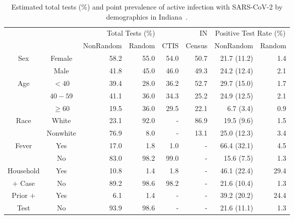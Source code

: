 \documentclass[11pt]{amsart}
\numberwithin{equation}{section}
\theoremstyle{plain}
\begin{document}
 \begin{table}[!th]
 \begin{tabular}{c | c | r r r | r | r r }
 & & \multicolumn{3}{c}{Total Tests (\%)} & IN & \multicolumn{2}{c}{Positive Test Rate (\%)}\\
 \cline{3-5} \cline{7-8}
 & & NonRandom & Random & CTIS & Census & NonRandom & Random \\ \hline
 \multirow{2}{*}{Sex} & Female & 58.2 & 55.0 & 54.0 & 50.7 & 21.7 (11.2) & 1.4 \\
 & Male & 41.8 & 45.0  & 46.0 & 49.3 & 24.2 (12.4) & 2.1 \\ \hline
 \multirow{3}{*}{Age} & $<40$ & 39.4 & 28.0  & 36.2 & 52.7
 & 29.7 (15.0) & 1.7 \\
 & $40-59$ & 41.1 & 36.0  & 34.3 & 25.2 & 24.9 (12.5) & 2.1 \\
 & $\geq 60$ & 19.5 & 36.0  & 29.5 & 22.1 & 6.7 (3.4) & 0.9 \\ \hline
 \multirow{2}{*}{Race} & White & 23.1 & 92.0  & - & 86.9 & 19.5 (9.6) & 1.5 \\
 & Nonwhite & 76.9 & 8.0  & - & 13.1 & 25.0 (12.3) & 3.4 \\ \hline
 \multirow{2}{*}{Fever} & Yes & 17.0 & 1.8  & 1.0 & - & 66.4 (32.1) & 4.5 \\
 & No & 83.0 & 98.2  & 99.0 & - & 15.6 (7.5) & 1.3 \\ \hline
 Household & Yes & 10.8 & 1.4  & 1.8 & - & 46.1 (22.4) & 29.4 \\
 $+$ Case & No & 89.2 & 98.6  & 98.2 & - & 21.6 (10.4) & 1.3 \\ \hline
 Prior $+$ & Yes & 6.1 & 1.4  & - & - & 39.2 (20.2) & 24.4 \\
 Test & No & 93.9 & 98.6  & - & - & 21.6 (11.1) & 1.3 \\ \hline
 \end{tabular}
 \caption{Estimated total tests ($\%$) and point prevalence of active infection with SARS-CoV-2 by demographics in Indiana~\citep{Yiannoutsos2021,doi:10.1073/pnas.2111454118}.}
 \label{tab:indiana}
 \end{table}
\end{document}
